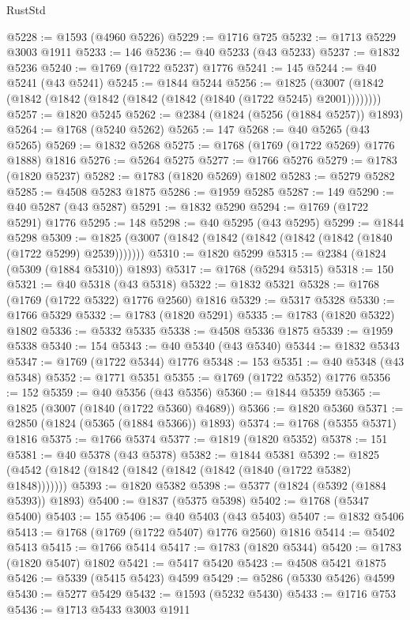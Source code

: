 \begin{lexlean}{RustStd}
\begin{coremodule}
@5228 := @1593 (@4960 @5226)
@5229 := @1716 @725
@5232 := @1713 @5229 @3003 @1911
@5233 := 146
@5236 := @40 @5233 (@43 @5233)
@5237 := @1832 @5236
@5240 := @1769 (@1722 @5237) @1776
@5241 := 145
@5244 := @40 @5241 (@43 @5241)
@5245 := @1844 @5244
@5256 := @1825 (@3007 (@1842 (@1842 (@1842 (@1842 (@1842 (@1842 (@1840 (@1722 @5245) @2001))))))))
@5257 := @1820 @5245
@5262 := @2384 (@1824 (@5256 (@1884 @5257)) @1893)
@5264 := @1768 (@5240 @5262)
@5265 := 147
@5268 := @40 @5265 (@43 @5265)
@5269 := @1832 @5268
@5275 := @1768 (@1769 (@1722 @5269) @1776 @1888) @1816
@5276 := @5264 @5275
@5277 := @1766 @5276
@5279 := @1783 (@1820 @5237)
@5282 := @1783 (@1820 @5269) @1802
@5283 := @5279 @5282
@5285 := @4508 @5283 @1875
@5286 := @1959 @5285
@5287 := 149
@5290 := @40 @5287 (@43 @5287)
@5291 := @1832 @5290
@5294 := @1769 (@1722 @5291) @1776
@5295 := 148
@5298 := @40 @5295 (@43 @5295)
@5299 := @1844 @5298
@5309 := @1825 (@3007 (@1842 (@1842 (@1842 (@1842 (@1842 (@1840 (@1722 @5299) @2539)))))))
@5310 := @1820 @5299
@5315 := @2384 (@1824 (@5309 (@1884 @5310)) @1893)
@5317 := @1768 (@5294 @5315)
@5318 := 150
@5321 := @40 @5318 (@43 @5318)
@5322 := @1832 @5321
@5328 := @1768 (@1769 (@1722 @5322) @1776 @2560) @1816
@5329 := @5317 @5328
@5330 := @1766 @5329
@5332 := @1783 (@1820 @5291)
@5335 := @1783 (@1820 @5322) @1802
@5336 := @5332 @5335
@5338 := @4508 @5336 @1875
@5339 := @1959 @5338
@5340 := 154
@5343 := @40 @5340 (@43 @5340)
@5344 := @1832 @5343
@5347 := @1769 (@1722 @5344) @1776
@5348 := 153
@5351 := @40 @5348 (@43 @5348)
@5352 := @1771 @5351
@5355 := @1769 (@1722 @5352) @1776
@5356 := 152
@5359 := @40 @5356 (@43 @5356)
@5360 := @1844 @5359
@5365 := @1825 (@3007 (@1840 (@1722 @5360) @4689))
@5366 := @1820 @5360
@5371 := @2850 (@1824 (@5365 (@1884 @5366)) @1893)
@5374 := @1768 (@5355 @5371) @1816
@5375 := @1766 @5374
@5377 := @1819 (@1820 @5352)
@5378 := 151
@5381 := @40 @5378 (@43 @5378)
@5382 := @1844 @5381
@5392 := @1825 (@4542 (@1842 (@1842 (@1842 (@1842 (@1842 (@1840 (@1722 @5382) @1848)))))))
@5393 := @1820 @5382
@5398 := @5377 (@1824 (@5392 (@1884 @5393)) @1893)
@5400 := @1837 (@5375 @5398)
@5402 := @1768 (@5347 @5400)
@5403 := 155
@5406 := @40 @5403 (@43 @5403)
@5407 := @1832 @5406
@5413 := @1768 (@1769 (@1722 @5407) @1776 @2560) @1816
@5414 := @5402 @5413
@5415 := @1766 @5414
@5417 := @1783 (@1820 @5344)
@5420 := @1783 (@1820 @5407) @1802
@5421 := @5417 @5420
@5423 := @4508 @5421 @1875
@5426 := @5339 (@5415 @5423) @4599
@5429 := @5286 (@5330 @5426) @4599
@5430 := @5277 @5429
@5432 := @1593 (@5232 @5430)
@5433 := @1716 @753
@5436 := @1713 @5433 @3003 @1911

\end{coremodule}
\end{lexlean}
